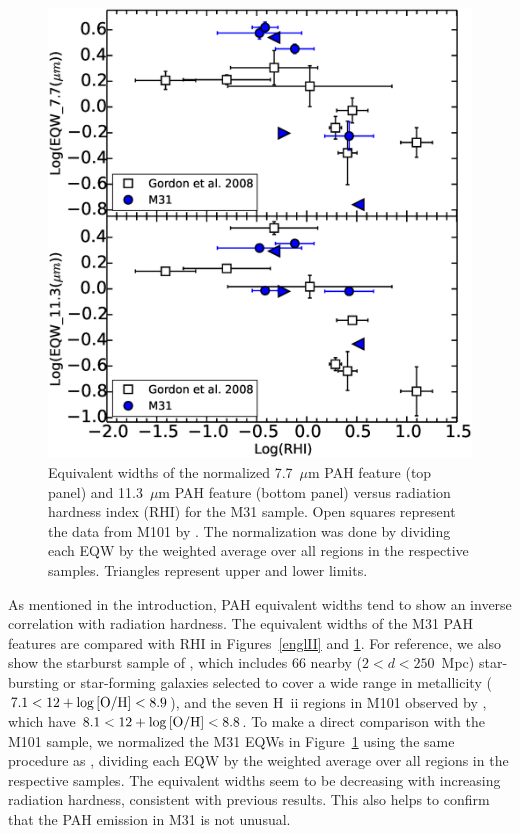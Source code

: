 \begin{figure}
\centering
\includegraphics[scale=0.30]{./Gordvsmy.eps}
\caption{Equivalent widths of the normalized 7.7~$\mu$m PAH feature (top panel) and 11.3~$\mu$m PAH feature (bottom panel) versus 
radiation hardness index (RHI) for the M31 sample. Open squares represent the data from M101 by \citet{Gordon:2008lr}. 
The normalization was done by dividing each EQW by the weighted average over all regions in the respective samples. Triangles represent upper and lower limits.}
\label{gordII}
\end{figure}


As mentioned in the introduction, PAH equivalent widths tend to show an inverse correlation with radiation hardness. 
The equivalent widths of the M31 PAH features are compared with RHI in Figures~\ref{englII} and \ref{gordII}.
For reference, we also show the starburst sample of \citet{Engelbracht_2008}, which includes 66 nearby ($2<d<250$~Mpc)
star-bursting or star-forming galaxies selected to cover a wide range in metallicity ($7.1<12+\log{\rm[O/H]}<8.9$),
and the seven H~{\sc ii} regions in M101 observed by \citet{Gordon:2008lr}, which have $8.1<12+\log{\rm[O/H]}<8.8$.
To make a direct comparison with the M101 sample, we normalized the M31 EQWs in Figure~\ref{gordII} using the same procedure
as \citet{Gordon:2008lr}, dividing each EQW by the  weighted average over all regions in the respective samples. 
The equivalent widths seem to be decreasing with increasing radiation hardness, consistent with previous results. 
This also helps to confirm that the PAH emission in M31 is not unusual. 


